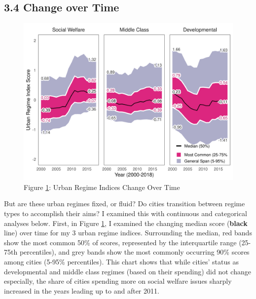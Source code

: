 \documentclass[preprint, 3p,
authoryear]{elsarticle} %
\begin{document}
\hypertarget{change-over-time}{%
\subsection{3.4 Change over Time}\label{change-over-time}}

\begin{figure}
\includegraphics[width=1\linewidth]{viz/bands} \caption{Figure \ref{fig:bands}: Urban Regime Indices Change Over Time}\label{fig:bands}
\end{figure}

\doublespacing

But are these urban regimes fixed, or fluid? Do cities transition
between regime types to accomplish their aims? I examined this with
continuous and categorical analyses below. First, in Figure
\ref{fig:bands}, I examined the changing median score (\textbf{black}
line) over time for my 3 urban regime indices. Surrounding the median,
red bands show the most common 50\% of scores, represented by the
interquartile range (25-75th percentiles), and grey bands show the most
commonly occurring 90\% scores among cities (5-95\% percentiles). This
chart shows that while cities' status as developmental and middle class
regimes (based on their spending) did not change especially, the share
of cities spending more on social welfare issues sharply increased in
the years leading up to and after 2011.
\end{document}

